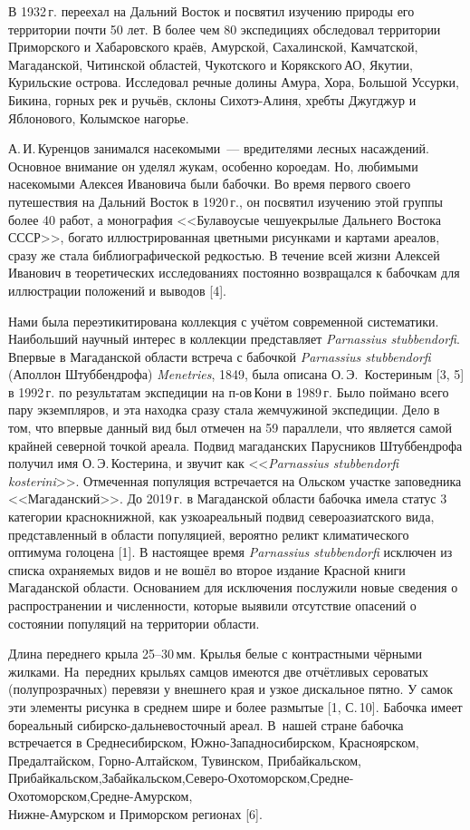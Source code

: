В 1932\,г. переехал на Дальний Восток и посвятил изучению природы его территории почти 50 лет. В более чем 80 экспедициях обследовал территории Приморского и Хабаровского краёв, Амурской, Сахалинской, Камчатской, Магаданской, Читинской областей, Чукотского и Корякского\,АО, Якутии, Курильские острова. Исследовал речные долины Амура, Хора, Большой Уссурки, Бикина, горных рек и ручьёв, склоны Сихотэ-Алиня, хребты Джугджур и Яблонового, Колымское нагорье.

А.\,И.\,Куренцов занимался насекомыми~--- вредителями лесных насаждений. Основное внимание он уделял жукам, особенно короедам. Но, любимыми насекомыми Алексея Ивановича были бабочки. Во время первого своего путешествия на Дальний Восток в 1920\,г., он посвятил изучению этой группы более 40 работ, а монография <<Булавоусые чешуекрылые Дальнего Востока СССР>>, богато иллюстрированная цветными рисунками и картами ареалов, сразу же стала библиографической редкостью. В течение всей жизни Алексей Иванович в теоретических исследованиях постоянно возвращался к бабочкам для иллюстрации положений и выводов [4].
\enlargethispage{\baselineskip}

Нами была переэтикитирована коллекция с учётом современной систематики. Наибольший научный интерес в коллекции представляет \textit{Parnassius stubbendorfi}. Впервые в Магаданской области встреча с бабочкой \textit{Parnassius stubbendorfi} (Аполлон Штуббендрофа) \textit{Menetries}, 1849, была описана О.\,Э.~Костериным [3, 5] в 1992\,г. по результатам экспедиции на п-ов\,Кони в 1989\,г. Было поймано всего пару экземпляров, и эта находка сразу стала жемчужиной экспедиции. Дело в том, что впервые данный вид был отмечен на 59 параллели, что является самой крайней северной точкой ареала. Подвид магаданских Парусников Штуббендрофа получил имя О.\,Э.\,Костерина, и звучит как <<\textit{Parnassius stubbendorfi kosterini}>>. Отмеченная популяция встречается на Ольском участке заповедника <<Магаданский>>. До 2019\,г. в Магаданской области бабочка имела статус 3\,категории краснокнижной, как узкоареальный подвид североазиатского вида, представленный в области популяцией, вероятно реликт климатического оптимума голоцена [1]. В настоящее время \textit{Parnassius stubbendorfi} исключен из списка охраняемых видов и не вошёл во второе издание Красной книги Магаданской области. Основанием для исключения послужили новые сведения о распространении и численности, которые выявили отсутствие опасений о состоянии популяций на территории области.

Длина переднего крыла 25--30\,мм. Крылья белые с контрастными чёрными жилками. На~передних крыльях самцов имеются две отчётливых сероватых (полупрозрачных) перевязи у внешнего края и узкое дискальное пятно. У самок эти элементы рисунка в среднем шире и более размытые [1, С.\,10]. Бабочка имеет бореальный сибирско-дальневосточный ареал. В~нашей стране бабочка встречается в Среднесибирском, Южно-Западносибирском, Красноярском, Предалтайском, Горно-Алтайском, Тувинском, Прибайкальском, Прибайкальском,\;\;Забайкальском,\;\;Северо-Охо\-то\-морс\-ком,\;\;\;Средне-Охотоморском,\;\;\;Средне-Амурском,\\Нижне-Амурском и Приморском регионах [6].

